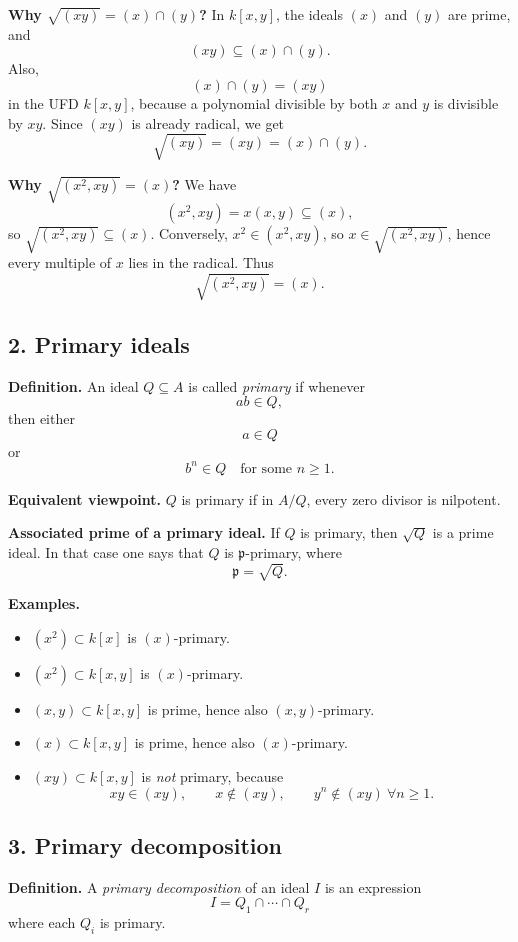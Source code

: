 \documentclass[12pt,a4paper]{article}
\theoremstyle{notespace}
\begin{document}
\textbf{Why \(\sqrt{(xy)}=(x)\cap(y)\)?}
In \(k[x,y]\), the ideals \((x)\) and \((y)\) are prime, and
\[
(xy)\subseteq (x)\cap(y).
\]
Also,
\[
(x)\cap(y)=(xy)
\]
in the UFD \(k[x,y]\), because a polynomial divisible by both \(x\) and \(y\) is divisible by \(xy\).
Since \((xy)\) is already radical, we get
\[
\sqrt{(xy)}=(xy)=(x)\cap(y).
\]

\textbf{Why \(\sqrt{(x^2,xy)}=(x)\)?}
We have
\[
(x^2,xy)=x(x,y)\subseteq (x),
\]
so \(\sqrt{(x^2,xy)}\subseteq (x)\).
Conversely, \(x^2\in (x^2,xy)\), so \(x\in \sqrt{(x^2,xy)}\), hence every multiple of \(x\) lies in the radical.
Thus
\[
\sqrt{(x^2,xy)}=(x).
\]

\subsection*{2. Primary ideals}

\textbf{Definition.}
An ideal \(Q\subseteq A\) is called \emph{primary} if whenever
\[
ab\in Q,
\]
then either
\[
a\in Q
\]
or
\[
b^n\in Q\quad \text{for some }n\ge 1.
\]

\textbf{Equivalent viewpoint.}
\(Q\) is primary if in \(A/Q\), every zero divisor is nilpotent.

\textbf{Associated prime of a primary ideal.}
If \(Q\) is primary, then \(\sqrt Q\) is a prime ideal.
In that case one says that \(Q\) is \(\mathfrak p\)-primary, where
\[
\mathfrak p=\sqrt Q.
\]

\textbf{Examples.}
\begin{itemize}
	\item \((x^2)\subset k[x]\) is \((x)\)-primary.
	\item \((x^2)\subset k[x,y]\) is \((x)\)-primary.
	\item \((x,y)\subset k[x,y]\) is prime, hence also \((x,y)\)-primary.
	\item \((x)\subset k[x,y]\) is prime, hence also \((x)\)-primary.
	\item \((xy)\subset k[x,y]\) is \emph{not} primary, because
	\[
	xy\in (xy),\qquad x\notin (xy),\qquad y^n\notin (xy)\ \forall n\ge 1.
	\]
\end{itemize}

\subsection*{3. Primary decomposition}

\textbf{Definition.}
A \emph{primary decomposition} of an ideal \(I\) is an expression
\[
I=Q_1\cap \cdots \cap Q_r
\]
where each \(Q_i\) is primary.
\end{document}

